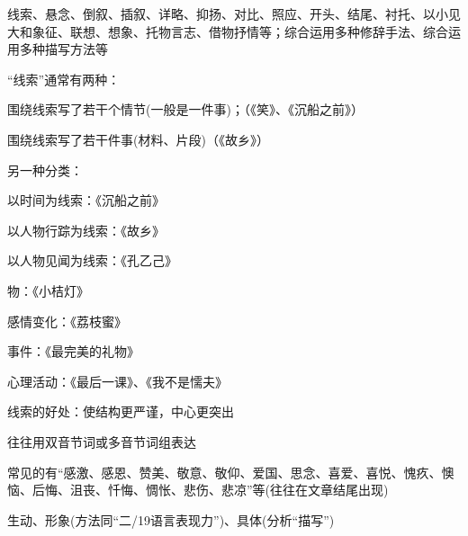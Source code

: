 线索、悬念、倒叙、插叙、详略、抑扬、对比、照应、开头、结尾、衬托、以小见大和象征、联想、想象、托物言志、借物抒情等；综合运用多种修辞手法、综合运用多种描写方法等\par
``线索''通常有两种：\begin{asparaenum}[(1)]\item 围绕线索写了若干个情节(一般是一件事)；（《笑》、《沉船之前》）
                      \item 围绕线索写了若干件事(材料、片段)（《故乡》）\end{asparaenum}

另一种分类：\begin{asparaenum}[(1)]\item 以时间为线索：《沉船之前》
              \item 以人物行踪为线索：《故乡》
              \item 以人物见闻为线索：《孔乙己》
              \item 物：《小桔灯》
              \item 感情变化：《荔枝蜜》
              \item 事件：《最完美的礼物》
              \item 心理活动：《最后一课》、《我不是懦夫》\end{asparaenum}

线索的好处：使结构更严谨，中心更突出

  往往用双音节词或多音节词组表达

  常见的有``感激、感恩、赞美、敬意、敬仰、爱国、思念、喜爱、喜悦、愧疚、懊恼、后悔、沮丧、忏悔、惆怅、悲伤、悲凉''等(往往在文章结尾出现)

  生动、形象(方法同``二/19语言表现力'')、具体(分析``描写'')

